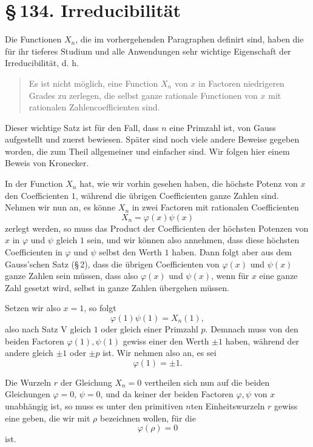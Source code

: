\documentclass[11pt]{article}
\providecommand{\sect}[2]{\section*{\S\,#1. #2}}
\begin{document}
\sect{134}{Irreducibilität}

Die Functionen $X_n$, die im vorhergehenden Paragraphen definirt sind, haben die für ihr tieferes Studium und alle Anwendungen sehr wichtige Eigenschaft der Irreducibilität, d. h.
\begin{quote}
Es ist nicht möglich, eine Function $X_n$ von $x$ in Factoren niedrigeren Grades zu zerlegen, die selbst ganze rationale Functionen von $x$ mit rationalen Zahlencoefficienten sind.
\end{quote}
Dieser wichtige Satz ist für den Fall, dass $n$ eine Primzahl ist, von Gauss aufgestellt und zuerst bewiesen. Später sind noch viele andere Beweise gegeben worden, die zum Theil allgemeiner und einfacher sind. Wir folgen hier einem Beweis von Kronecker.

In der Function $X_n$ hat, wie wir vorhin gesehen haben, die höchste Potenz von $x$ den Coefficienten $1$, während die übrigen Coefficienten ganze Zahlen sind. Nehmen wir nun an, es könne $X_n$ in zwei Factoren mit rationalen Coefficienten
\[
\tag{1}        X_n=\varphi(x)\psi(x)
\]
zerlegt werden, so muss das Product der Coefficienten der höchsten Potenzen von $x$ in $\varphi$ und $\psi$ gleich $1$ sein, und wir können also annehmen, dass diese höchsten Coefficienten in $\varphi$ und $\psi$ selbst den Werth $1$ haben. Dann folgt aber aus dem Gauss'schen Satz (\S\,2), dass die übrigen Coefficienten von $\varphi(x)$ und $\psi(x)$ ganze Zahlen sein müssen, dass also $\varphi(x)$ und $\psi(x)$, wenn für $x$ eine ganze Zahl gesetzt wird, selbst in ganze Zahlen übergehen müssen.

Setzen wir also $x=1$, so folgt
\[
        \varphi(1)\psi(1)=X_n(1),
\]
also nach Satz V gleich $1$ oder gleich einer Primzahl $p$. Demnach muss von den beiden Factoren $\varphi(1),\psi(1)$ gewiss einer den Werth $\pm1$ haben, während der andere gleich $\pm1$ oder $\pm p$ ist. Wir nehmen also an, es sei
\[
\tag{2}        \varphi(1)=\pm1.
\]

Die Wurzeln $r$ der Gleichung $X_n=0$ vertheilen sich nun auf die beiden Gleichungen $\varphi=0$, $\psi=0$, und da keiner der beiden Factoren $\varphi,\psi$ von $x$ unabhängig ist, so muss es unter den primitiven $n$ten Einheitswurzeln $r$ gewiss eine geben, die wir mit $\rho$ bezeichnen wollen, für die
\[
        \varphi(\rho)=0
\]
ist.
\end{document}
